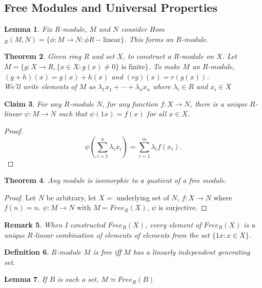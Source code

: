 \documentclass[a4paper,12pt]{article}
\newtheorem{thm}{Theorem}[section]
\newtheorem{lem}[thm]{Lemma}
\newtheorem{defn}[thm]{Definition}
\newtheorem{claim}[thm]{Claim}
\newtheorem{rmk}[thm]{Remark}
\begin{document}
\subsection{Free Modules and Universal Properties}
\begin{lem}
    Fix $R$-module, $M$ and $N$ consider Hom$_R(M,N)= \{\phi:M\to N:\phi R- \text{linear}\}$. This forms an $R$-module.  
\end{lem}
\begin{thm}
    Given ring $R$ and set $X$, to construct a $R$-module on $X$. Let $M= \{g:X\to R, \{x\in X: g(x)\neq 0\} \text{ is finite}\}$. To make $M$ an $R$-module, $(g+h)(x)=g(x)+h(x)$ and $(rg)(x)=r(g(x))$. \\
    We'll write elements of $M$ as $\lambda_1 x_1+\cdots+\lambda_n x_n$ where $\lambda_i\in R$ and $x_i\in X$
\end{thm}
\begin{claim}
    For any $R$-module $N$, for any function $f:X\to N$, there is a unique $R$-linear $\psi:M\to N$ such that $\psi(1x)=f(x)$ for all $x\in X$.
\end{claim}
\begin{proof}
    \[
    \psi \left( \sum_{i=1}^n \lambda_i x_i \right)=\sum_{i=1}^m \lambda_i f(x_i)
    .\] 
\end{proof}
\begin{thm}
    Any module is isomorphic to a quotient of a free module. 
\end{thm}
\begin{proof}
    Let $N$ be arbitrary, let $X=$ underlying set of $N$, $f:X\to N$ where $f(n)=n$. $\psi:M\to N$ with $M=Free_R(X)$, $\psi$ is surjective. 
\end{proof}
\begin{rmk}
    When I constructed $Free_R(X)$, every element of $Free_R(X)$ is a unique $R$-linear combination of elements of elements from the set $ \{1x:x\in X\}$. 
\end{rmk}
\begin{defn}
    $R$-module $M$ is free iff $M$ has a linearly independent generating set. 
\end{defn}
\begin{lem}
    If $B$ is such a set, $M\simeq Free_R(B)$
\end{lem}
\end{document}
